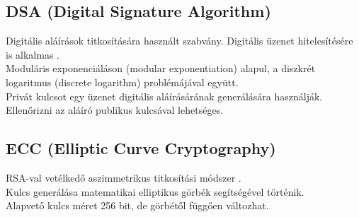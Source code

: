 \subsection{DSA (Digital Signature Algorithm)}
\noindent Digitális aláírások titkosítására használt szabvány. Digitális üzenet hitelesítésére is alkalmas \cite{yassein2017comprehensive}.
\vspace{5pt}\\ Moduláris exponenciáláson (modular exponentiation) alapul, a diszkrét logaritmus (discrete logarithm) problémájával együtt.
\vspace{5pt}\\ Privát kulcsot egy üzenet digitális aláírásárának generálására használják. Ellenőrizni az aláíró publikus kulcsával lehetséges.


\subsection{ECC (Elliptic Curve Cryptography)}
\noindent RSA-val vetélkedő aszimmetrikus titkosítási módszer \cite{gupta2011ecc}.
\vspace{5pt}\\ Kulcs generálása matematikai elliptikus görbék segítségével történik.
\vspace{5pt}\\ Alapvető kulcs méret 256 bit, de görbétől függően változhat.

